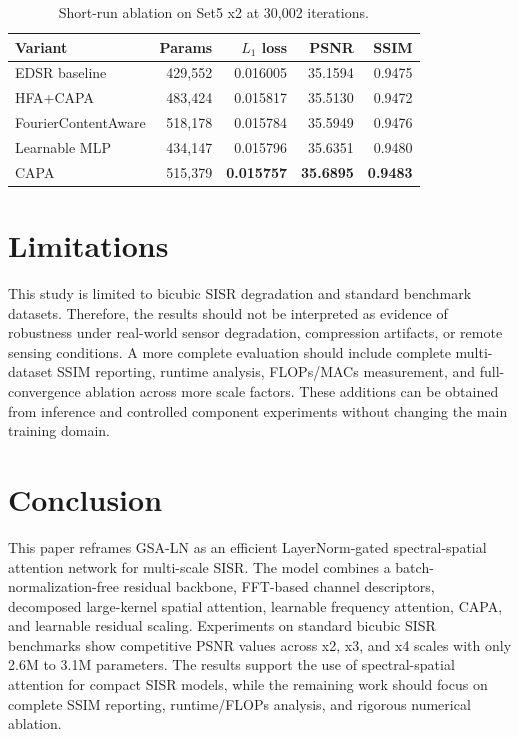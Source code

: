 \documentclass[conference]{IEEEtran}
\begin{document}
\begin{table}[H]
\centering
\caption{Short-run ablation on Set5 x2 at 30,002 iterations.}
\label{tab:ablation}
\scriptsize
\setlength{\tabcolsep}{2.8pt}
\begin{tabular}{lrrrr}
\toprule
Variant & Params & $L_1$ loss & PSNR & SSIM \\
\midrule
EDSR baseline & 429,552 & 0.016005 & 35.1594 & 0.9475 \\
HFA+CAPA & 483,424 & 0.015817 & 35.5130 & 0.9472 \\
FourierContentAware & 518,178 & 0.015784 & 35.5949 & 0.9476 \\
Learnable MLP & 434,147 & 0.015796 & 35.6351 & 0.9480 \\
CAPA & 515,379 & \textbf{0.015757} & \textbf{35.6895} & \textbf{0.9483} \\
\bottomrule
\end{tabular}
\end{table}

\section{Limitations}

This study is limited to bicubic SISR degradation and standard benchmark datasets. Therefore, the results should not be interpreted as evidence of robustness under real-world sensor degradation, compression artifacts, or remote sensing conditions. A more complete evaluation should include complete multi-dataset SSIM reporting, runtime analysis, FLOPs/MACs measurement, and full-convergence ablation across more scale factors. These additions can be obtained from inference and controlled component experiments without changing the main training domain.

\section{Conclusion}

This paper reframes GSA-LN as an efficient LayerNorm-gated spectral-spatial attention network for multi-scale SISR. The model combines a batch-normalization-free residual backbone, FFT-based channel descriptors, decomposed large-kernel spatial attention, learnable frequency attention, CAPA, and learnable residual scaling. Experiments on standard bicubic SISR benchmarks show competitive PSNR values across x2, x3, and x4 scales with only 2.6M to 3.1M parameters. The results support the use of spectral-spatial attention for compact SISR models, while the remaining work should focus on complete SSIM reporting, runtime/FLOPs analysis, and rigorous numerical ablation.
\end{document}
